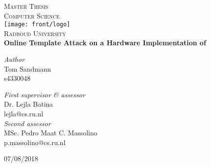 \begin{titlepage}
	\begin{center}
		\textsc{\Huge Master Thesis\\Computer Science}\\[1.5cm]
		\texttt{[image: front/logo]}\\
		\vspace{0.4cm}
		\textsc{\Large Radboud University}\\[1cm]
		\vspace{0.4cm}
		\textbf{\huge  Online Template Attack on a Hardware Implementation of \fourq}\\[0.4cm]
		\vspace{2cm}
		\begin{minipage}[t]{0.45\textwidth}
			\begin{flushleft} \large
				\textit{Author}\\
				Tom Sandmann\\
				s4330048
			\end{flushleft}
		\end{minipage}
		\begin{minipage}[t]{0.45\textwidth}
			\begin{flushright} \large
				\textit{First supervisor \& assessor}\\
				Dr. Lejla Batina\\
				lejla@cs.ru.nl \\[1.3cm]
				\textit{Second assessor}\\
				MSc. Pedro Maat C. Massolino \\
				p.massolino@cs.ru.nl
			\end{flushright}
		\end{minipage}
		\vfill
		{\large 07/08/2018}
	\end{center}
\end{titlepage}
